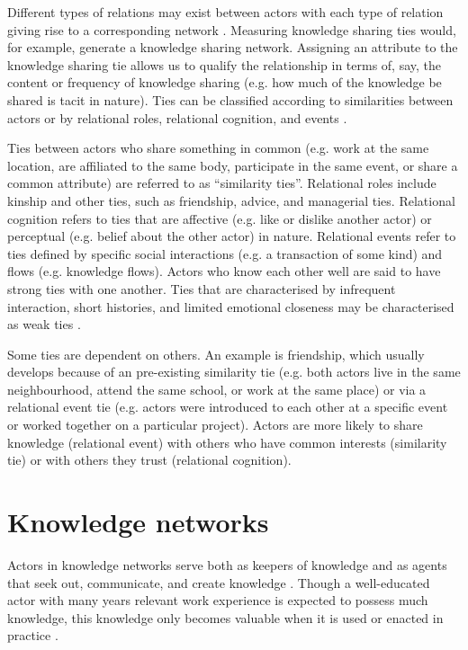 Different types of relations may exist between actors with each type of relation giving rise to a corresponding network \citep{borgatti2013analyzing}. Measuring knowledge sharing ties would, for example, generate a knowledge sharing network. Assigning an attribute to the knowledge sharing tie allows us to qualify the relationship in terms of, say, the content or frequency of knowledge sharing (e.g. how much of the knowledge be shared is tacit in nature). Ties can be classified according to similarities between actors or by relational roles, relational cognition, and events \citep{borgatti2013analyzing}. \medskip

Ties between actors who share something in common (e.g. work at the same location, are affiliated to the same body, participate in the same event, or share a common attribute) are referred to as \enquote{similarity ties}. Relational roles include kinship and other ties, such as friendship, advice, and managerial ties. Relational cognition refers to ties that are affective (e.g. like or dislike another actor) or perceptual (e.g. belief about the other actor) in nature. Relational events refer to ties defined by specific social interactions (e.g. a transaction of some kind) and flows (e.g. knowledge flows). Actors who know each other well are said to have strong ties with one another. Ties that are characterised by infrequent interaction, short histories, and limited emotional closeness may be characterised as weak ties \citep{baer2010strength}. 

Some ties are dependent on others. An example is friendship, which usually develops because of an pre-existing similarity tie (e.g. both actors live in the same neighbourhood, attend the same school, or work at the same place) or via a relational event tie (e.g. actors were introduced to each other at a specific event or worked together on a particular project). Actors are more likely to share knowledge (relational event) with others who have common interests (similarity tie) or with others they trust (relational cognition). \medskip 

\section{Knowledge networks} %

Actors in knowledge networks serve both as keepers of knowledge and as agents that seek out, communicate, and create knowledge \citep{phelps2012knowledge,pugh2013designing}. Though a well-educated actor with many years relevant work experience is expected to possess much knowledge, this knowledge only becomes valuable when it is used or enacted in practice \citep{marabelli2012knowledge,freeman2015knowledge}. 

